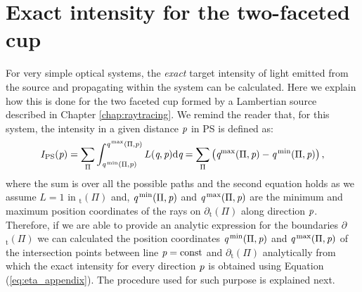 \chapter{Exact intensity for the two-faceted cup}\label{app:boundariescup}
For very simple optical systems, the \textit{exact} target intensity of light emitted from the source and propagating within the system can be calculated. Here we explain how this is done for the two faceted cup formed by a Lambertian source described in Chapter \ref{chap:raytracing}. We remind the reader that, for this system, the intensity in a given distance $\textit{p}$ in PS is defined as:
\begin{equation}\label{eq:eta_appendix}
I_{\textrm{PS}}(\textit{p}) = \sum_{\Pi}\int_{\textit{q}^\textrm{\,min}(\Pi, \textit{p})}^{\textit{q}^\textrm{\,max}(\Pi,\textit{p})}L(\textit{q}, \textit{p})\textrm{d}\textit{q} = \sum_{\Pi}\big (\textit{q}^\textrm{max}(\Pi,\textit{p})-\textit{q}^\textrm{\,min}(\Pi,\textit{p})\big )\,,
\end{equation}
where the sum is over all the possible paths and the second equation holds as we assume $L=1$ in $_\textrm{t}(\Pi)$ and, $\textit{q}^\textrm{\,min}(\Pi,\textit{p})$ and $\textit{q}^\textrm{\,max}(\Pi,\textit{p})$ are the minimum and maximum position coordinates of the rays on $\partial$$_\textrm{t}(\Pi)$ along direction $\textit{p}$. Therefore, if we are able to provide an analytic expression for the boundaries $\partial$$_\textrm{t}(\Pi)$ we can calculated the position coordinates $\textit{q}^\textrm{\,min}(\Pi,\textit{p})$ and $\textit{q}^\textrm{\,max}(\Pi,\textit{p})$ of the intersection points between line $\textit{p}=\textrm{const}$ and $\partial$$_\textrm{t}(\Pi)$ analytically from which the exact intensity for every direction $\textit{p}$ is obtained using Equation (\ref{eq:eta_appendix}). The procedure used for such purpose is explained next.

